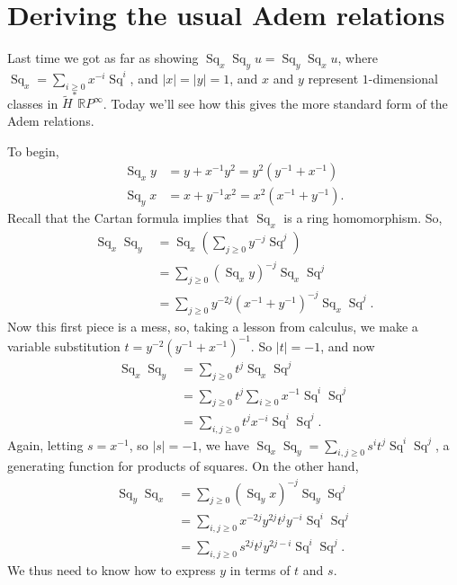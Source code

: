 \documentclass{article}
\newcommand{\OutputDerivingTheUsualAdemRelations}{}
\newcommand{\R}{\mathbb{R}}
\newcommand{\RP}{\R P}
\DeclareMathOperator{\Sq}{Sq}
\begin{document}
\fi
\section{Deriving the usual Adem relations} %
\ifx\OutputDerivingTheUsualAdemRelations\undefined\else
Last time we got as far as showing $\Sq_x \Sq_y u = \Sq_y \Sq_x u$, where $\Sq_x = \sum_{i \ge 0} x^{-i} \Sq^i$, and $|x| = |y| = 1$, and $x$ and $y$ represent $1$-dimensional classes in $\tilde H^* \RP^\infty$. %
Today we'll see how this gives the more standard form of the Adem relations.

To begin,
\begin{align*}
\Sq_x y & = y + x^{-1} y^2 = y^2(y^{-1} + x^{-1}) \\
\Sq_y x & = x + y^{-1} x^2 = x^2(x^{-1} + y^{-1}).
\end{align*}
Recall that the Cartan formula implies that $\Sq_x$ is a ring homomorphism.  So,
\begin{align*}
\Sq_x \Sq_y & = \Sq_x \left( \sum_{j \ge 0} y^{-j} \Sq^j \right) \\
& = \sum_{j \ge 0}(\Sq_x y)^{-j} \Sq_x \Sq^j \\
& = \sum_{j \ge 0} y^{-2j}(x^{-1} + y^{-1})^{-j} \Sq_x \Sq^j.
\end{align*}
Now this first piece is a mess, so, taking a lesson from calculus, we make a variable substitution $t = y^{-2}(y^{-1} + x^{-1})^{-1}$.  So $|t| = -1$, and now
\begin{align*}
\Sq_x \Sq_y & = \sum_{j \ge 0} t^j \Sq_x \Sq^j \\
& = \sum_{j \ge 0} t^j \sum_{i \ge 0} x^{-1} \Sq^i \Sq^j \\
& = \sum_{i, j \ge 0} t^j x^{-i} \Sq^i \Sq^j.
\end{align*}
Again, letting $s = x^{-1}$, so $|s| = -1$, we have $\Sq_x \Sq_y = \sum_{i, j \ge 0} s^i t^j \Sq^i \Sq^j$, a generating function for products of squares.  On the other hand,
\begin{align*}
\Sq_y \Sq_x & = \sum_{j \ge 0}(\Sq_y x)^{-j} \Sq_y \Sq^j \\
& = \sum_{i, j \ge 0} x^{-2j} y^{2j} t^j y^{-i} \Sq^i \Sq^j \\
& = \sum_{i, j \ge 0} s^{2j} t^j y^{2j-i} \Sq^i \Sq^j.
\end{align*}
We thus need to know how to express $y$ in terms of $t$ and $s$.
\end{document}
